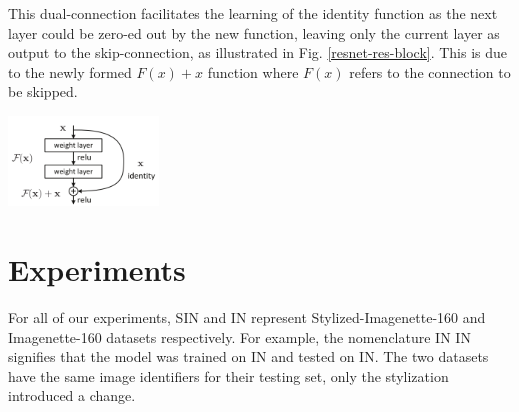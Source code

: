 \documentclass{article}
\begin{document}
\noindent
This dual-connection facilitates the learning of the identity function as 
the next layer could be zero-ed out by the new function, leaving only the current layer as output to 
the skip-connection, as illustrated in Fig. \ref{resnet-res-block}. 
This is due to the newly formed $F(x) + x$ function where $F(x)$ refers to the connection to be skipped.
\vspace{0.7cm}

\begin{center}
  \captionsetup{type=figure}
  \includegraphics[width=0.3\textwidth]{imgs/resnet/residual-block}
  \label{resnet-res-block}
\end{center}








\newpage
\section{Experiments}

For all of our experiments, SIN and IN represent Stylized-Imagenette-160 and Imagenette-160 datasets respectively.
For example, the nomenclature IN \texorpdfstring{\textrightarrow} .IN signifies that the 
model was trained on IN and tested on IN.
The two datasets have the same image identifiers for their testing set, only the stylization introduced a change.
\end{document}
